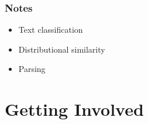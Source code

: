\documentclass{beamer}             %
\begin{document}
\begin{frame}
  \frametitle{Notes}
  \begin{itemize}
    \item Text classification
    \item Distributional similarity
    \item Parsing
  \end{itemize}
\end{frame}


\section{Getting Involved}

\end{document}
